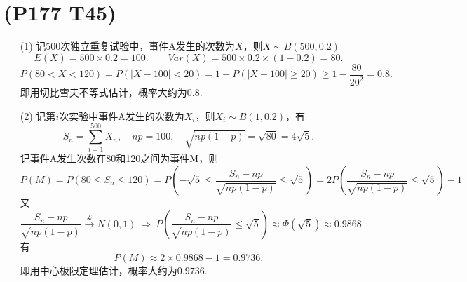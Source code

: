 \documentclass{article}
\begin{document}
\section{(P177 T45)}  %
\begin{enumerate}
    \item [(1)]记500次独立重复试验中，事件A发生的次数为$X$，则$X\sim B(500,0.2)$
    \[
        E(X) = 500 \times 0.2 = 100. 
        \qquad 
        Var(X) = 500\times 0.2 \times (1 - 0.2) = 80.
    \]
    \[
        P(80<X<120) 
        = P(|X-100|<20) 
        = 1 - P(|X-100|\geq 20) 
        \geq  1 - \frac{80}{20^2} 
        = 0.8 .    
    \]
    即用切比雪夫不等式估计，概率大约为$0.8$.
    \item [(2)]记第$i$次实验中事件A发生的次数为$X_i$，则$X_i \sim B(1,0.2)$，有
    \[
        S_n = \sum\limits_{i=1}^{500} X_n ,\quad
        np = 100,\quad
        \sqrt{np(1-p)} = \sqrt{80} = 4\sqrt{5}.
    \]
    记事件A发生次数在80和120之间为事件M，则
    \[
        P(M)
        = P(80 \leq S_n \leq 120)
        = P\left(-\sqrt{5} \leq \frac{S_n - np}{\sqrt{np(1-p)}} \leq \sqrt{5} \right)
        = 2 P\left(\frac{S_n - np}{\sqrt{np(1-p)}} \leq \sqrt{5} \right) - 1
    \]
    又
    \[
        \frac{S_n - np}{\sqrt{np(1-p)}} 
        \xrightarrow{\mathcal{L} }
        N(0,1)    
        \ \Rightarrow\ 
        P\left(\frac{S_n - np}{\sqrt{np(1-p)}} \leq \sqrt{5} \right)
        \approx \Phi(\sqrt{5})
        \approx 0.9868
    \]
    有
    \[
        P(M) \approx 2\times 0.9868 - 1 = 0.9736 .
    \]
    即用中心极限定理估计，概率大约为$0.9736$.
\end{enumerate}
\end{document}
